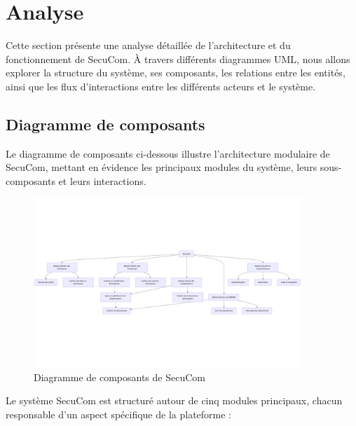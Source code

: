 \documentclass[12pt,a4paper]{report}
\begin{document}
\chapter{Analyse}

Cette section présente une analyse détaillée de l'architecture et du fonctionnement de SecuCom. À travers différents diagrammes UML, nous allons explorer la structure du système, ses composants, les relations entre les entités, ainsi que les flux d'interactions entre les différents acteurs et le système.

\section{Diagramme de composants}

Le diagramme de composants ci-dessous illustre l'architecture modulaire de SecuCom, mettant en évidence les principaux modules du système, leurs sous-composants et leurs interactions.

\begin{figure}[h]
\centering
\includegraphics[width=0.9\textwidth]{ComposantsDiagram.png}
\caption{Diagramme de composants de SecuCom}
\end{figure}

Le système SecuCom est structuré autour de cinq modules principaux, chacun responsable d'un aspect spécifique de la plateforme :
\end{document}
